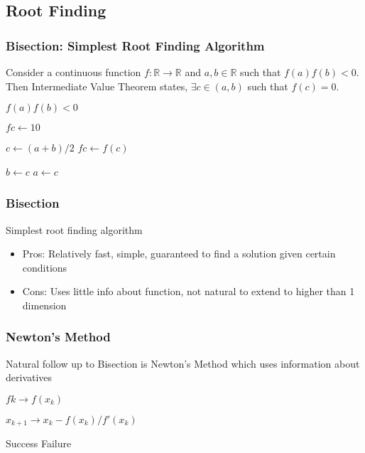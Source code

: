 \documentclass[10pt]{beamer}
\begin{document}
\subsection{Root Finding}

\begin{frame} \frametitle{Bisection: Simplest Root Finding Algorithm}

  Consider a continuous function $f : \mathbb{R} \rightarrow \mathbb{R}$ and $a, b \in \mathbb{R}$ such that $f(a) f(b) < 0$. Then Intermediate Value Theorem states, $\exists c \in (a, b)$ such that $f(c)  = 0$.

  \begin{algorithmic}
    \REQUIRE $f(a) f(b) < 0$

    \STATE $fc \leftarrow 10$

      \STATE $c \leftarrow (a+b)/2$
      \STATE $fc \leftarrow f(c)$

        \STATE $b \leftarrow c$
      \ELSE
        \STATE $a \leftarrow c$
      \ENDIF
    \ENDWHILE

  \end{algorithmic}

\end{frame}

\begin{frame} \frametitle{Bisection}
  Simplest root finding algorithm
  \begin{itemize}
    \item Pros: Relatively fast, simple, guaranteed to find a solution given certain conditions
    \item Cons: Uses little info about function, not natural to extend to higher than 1 dimension
  \end{itemize}
\end{frame}

\begin{frame} \frametitle{Newton's Method}

  Natural follow up to Bisection is Newton's Method which uses information about derivatives

  \begin{algorithmic}
    \STATE $fk \rightarrow f(x_k)$

      \STATE $x_{k+1} \rightarrow x_k - f(x_k)/f'(x_k)$
    \ENDWHILE

      \STATE Success
    \ELSE
      \STATE Failure
    \ENDIF

  \end{algorithmic}

\end{frame}
\end{document}
